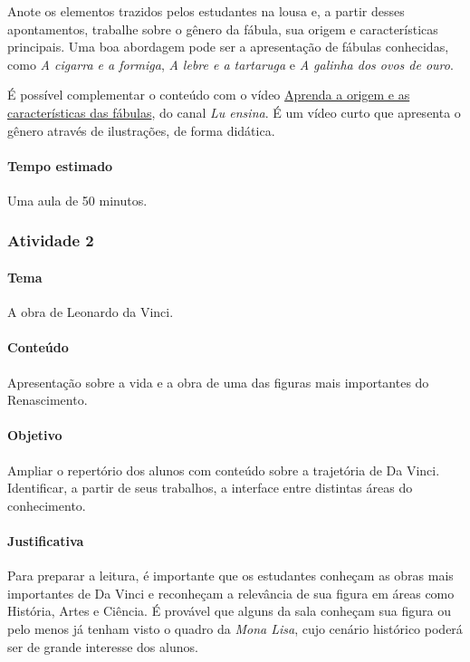 \documentclass[11pt]{extarticle}
\begin{document}
Anote os elementos trazidos pelos estudantes na lousa e, a partir desses apontamentos, trabalhe sobre o gênero da fábula, sua origem e características principais. Uma boa abordagem pode ser a apresentação de fábulas conhecidas, como \textit{A cigarra e a formiga}, \textit{A lebre e a tartaruga} e \textit{A galinha dos ovos de ouro}.


É possível complementar o conteúdo com o vídeo \href{https://youtu.be/lGm0nfoRBiI}{Aprenda a origem e as características das fábulas}, do canal \textit{Lu ensina}. É um vídeo curto que apresenta o gênero através de ilustrações, de forma didática.

\paragraph{Tempo estimado} Uma aula de 50 minutos.

\subsubsection{Atividade 2}


\paragraph{Tema} A obra de Leonardo da Vinci.

\paragraph{Conteúdo} Apresentação sobre a vida e a obra de uma das figuras mais importantes do Renascimento.

\paragraph{Objetivo} Ampliar o repertório dos alunos com conteúdo sobre a trajetória de Da Vinci. Identificar, a partir de seus trabalhos, a interface entre distintas áreas do conhecimento.

\paragraph{Justificativa} Para preparar a leitura, é importante que os estudantes conheçam as obras mais importantes de Da Vinci e reconheçam a relevância de sua figura em áreas como História, Artes e Ciência. É provável que alguns da sala conheçam sua figura ou pelo menos já tenham visto o quadro da \textit{Mona Lisa}, cujo cenário histórico poderá ser de grande interesse dos alunos.
\end{document}

